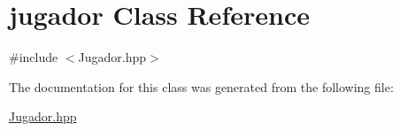 \hypertarget{classjugador}{\section{jugador Class Reference}
\label{classjugador}
}


{\ttfamily \#include $<$Jugador.\+hpp$>$}



The documentation for this class was generated from the following file\+:\begin{DoxyCompactItemize}
\item 
\hyperlink{_jugador_8hpp}{Jugador.\+hpp}\end{DoxyCompactItemize}
